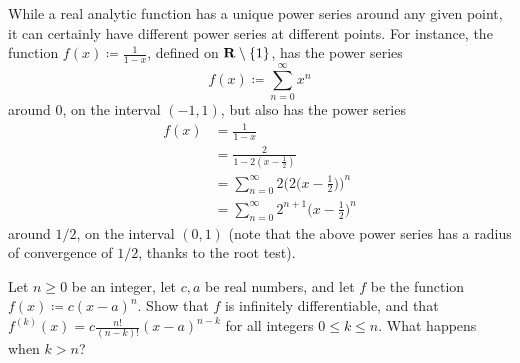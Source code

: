 \begin{remark}\label{4.2.13}
    While a real analytic function has a unique power series around any given point, it can certainly have different power series at different points.
    For instance, the function \(f(x) \coloneqq \frac{1}{1 - x}\), defined on \(\mathbf{R} \setminus \{1\}\), has the power series
    \[
        f(x) \coloneqq \sum_{n = 0}^\infty x^n
    \]
    around \(0\), on the interval \((-1, 1)\), but also has the power series
    \begin{align*}
        f(x) & = \frac{1}{1 - x}                                                  \\
             & = \frac{2}{1 - 2(x - \frac{1}{2})}                                 \\
             & = \sum_{n = 0}^\infty 2 \bigg(2\bigg(x - \frac{1}{2}\bigg)\bigg)^n \\
             & = \sum_{n = 0}^\infty 2^{n + 1} \bigg(x - \frac{1}{2}\bigg)^n
    \end{align*}
    around \(1 / 2\), on the interval \((0, 1)\)
    (note that the above power series has a radius of convergence of \(1 / 2\), thanks to the root test).
\end{remark}

\exercisesection

\begin{exercise}\label{ex 4.2.1}
    Let \(n \geq 0\) be an integer, let \(c, a\) be real numbers, and let \(f\) be the function \(f(x) \coloneqq c (x - a)^n\).
    Show that \(f\) is infinitely differentiable, and that \(f^{(k)}(x) = c \frac{n!}{(n - k)!} (x - a)^{n - k}\) for all integers \(0 \leq k \leq n\).
    What happens when \(k > n\)?
\end{exercise}

